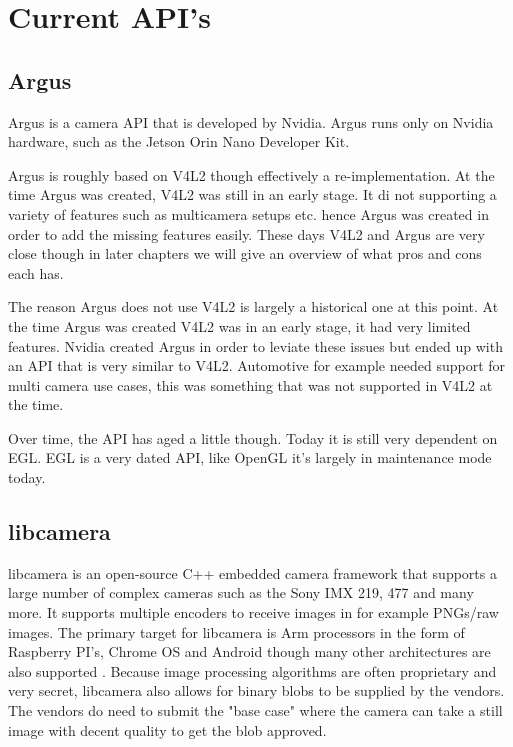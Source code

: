 \chapter{Current API's\label{currentAPIs}}
\section{Argus}

Argus is a camera API that is developed by Nvidia. Argus runs only on Nvidia
hardware, such as the Jetson Orin Nano Developer Kit.

Argus is roughly based on V4L2 though effectively a re-implementation. At the
time Argus was created, V4L2 was still in an early stage. It di not supporting
a variety of features such as multicamera setups etc. hence Argus was created
in order to add the missing features easily. These days V4L2 and Argus are very
close though in later chapters we will give an overview of what pros and cons
each has.

The reason Argus does not use V4L2 is largely a historical one at this point.
At the time Argus was created V4L2 was in an early stage, it had very limited
features. Nvidia created Argus in order to leviate these issues but ended up
with an API that is very similar to V4L2. Automotive for example needed support
for multi camera use cases, this was something that was not supported in V4L2 at
the time.

Over time, the API has aged a little though. Today it is still very dependent on
EGL. EGL is a very dated API, like OpenGL it's largely in maintenance mode
today.

\section{libcamera}
libcamera is an open-source C++ embedded camera framework that supports a large
number of complex cameras such as the Sony IMX 219, 477 and many more. It
supports multiple encoders to receive images in for example PNGs/raw images.
The primary target for libcamera is Arm processors in the form of Raspberry
PI's, Chrome OS and Android though many other architectures are also supported
\cite{libcameraStack}. Because image processing algorithms are often
proprietary and very secret, libcamera also allows for binary blobs to be
supplied by the vendors. The vendors do need to submit the "base case" where
the camera can take a still image with decent quality to get the blob approved.

